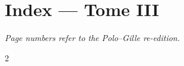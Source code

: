 \chapter*{Index --- Tome III}
\noindent\emph{Page numbers refer to the Polo--Gille re-edition.}
\medskip
\begin{multicols}{2}
\small
\setlength{\parskip}{1.2pt}

\end{multicols}
